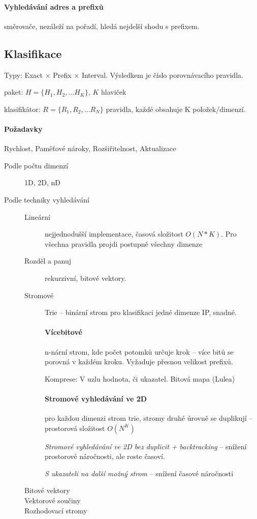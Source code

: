 \documentclass[a4paper, 11pt]{report}
\begin{document}
\paragraph{Vyhledávání adres a prefixů} směrovače, nezáleží na pořadí, hledá nejdelší shodu s prefixem.

\subsection{Klasifikace} Typy: Exact $\times$ Prefix $\times$ Interval. Výsledkem je číslo porovnávacího pravidla.

paket: $H = \{ H_1, H_2, \dots H_K\}$, $K$ hlaviček

klasifikátor: $R = \{R_1, R_2, \dots R_N\}$ pravidla, každé obsahuje K položek/dimenzí.

\paragraph{Požadavky} Rychlost, Paměťové nároky, Rozšiřitelnost, Aktualizace

\begin{description}
	\item[Podle počtu dimenzí] 1D, 2D, nD
	\item[Podle techniky vyhledávání]
	\begin{description}
		\item[Lineární] nejjednodušší implementace, časová složitost $O(N*K)$. Pro všechna pravidla projdi postupně všechny dimenze
		\item[Rozděl a panuj] rekurzivní, bitové vektory.
		\item[Stromové] Trie -- binární strom pro klasifikaci jedné dimenze IP, snadné.
		
		\paragraph{Vícebitové} n-nární strom, kde počet potomků určuje krok -- více bitů se porovná v každém kroku. Vyžaduje přesnou velikost prefixů.
		
		Komprese: V uzlu hodnota, či ukazatel. Bitová mapa (Lulea)
		
		\paragraph{Stromové vyhledávání ve 2D} pro každou dimenzi strom trie, stromy druhé úrovně se duplikují -- prostorová složitost $O(N^K)$
		
		\emph{Stromové vyhledávání ve 2D bez duplicit + backtracking} -- snížení prostorové náročnosti, ale roste časoví.
		
		\emph{S ukazateli na další možný strom} -- snížení časové náročnosti
		\item[Bitové vektory] 
		\item[Vektorové součiny]
		\item[Rozhodovací stromy]
	\end{description}
\end{description}
\end{document}
